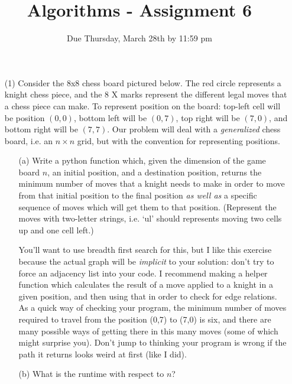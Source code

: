 \documentclass[12pt]{article}
\title{Algorithms - Assignment 6}
\date{Due Thursday, March 28th by 11:59 pm}
\begin{document}
\maketitle

\begin{enumerate}
    \item[(1)] Consider the 8x8 chess board pictured below. The red circle represents a knight chess piece, and the 8 X marks represent the different legal moves that a chess piece can make. To represent position on the board: top-left cell will be position $(0,0)$, bottom left will be $(0,7)$, top right will be $(7,0)$, and bottom right will be $(7,7)$. Our problem will deal with a \emph{generalized} chess board, i.e. an $n \times n$ grid, but with the convention for representing positions. \par 
    \begin{itemize}
        \item[(a)] Write a python function which, given the dimension of the game board $n$, an initial position, and a destination position, returns the minimum number of moves that a knight needs to make in order to move from that initial position to the final position \emph{as well as} a specific sequence of moves which will get them to that position. (Represent the moves with two-letter strings, i.e. `ul' should represents moving two cells up and one cell left.) \par 
    
        You'll want to use breadth first search for this, but I like this exercise because the actual graph will be \emph{implicit} to your solution: don't try to force an adjacency list into your code. I recommend making a helper function which calculates the result of a move applied to a knight in a given position, and then using that in order to check for edge relations. As a quick way of checking your program, the minimum number of moves required to travel from the position (0,7) to (7,0) is six, and there are many possible ways of getting there in this many moves (some of which might surprise you). Don't jump to thinking your program is wrong if the path it returns looks weird at first (like I did).
        \item[(b)] What is the runtime with respect to $n$?
    \end{itemize}
    \begin{center}
\end{center}
\end{enumerate}
\end{document}
